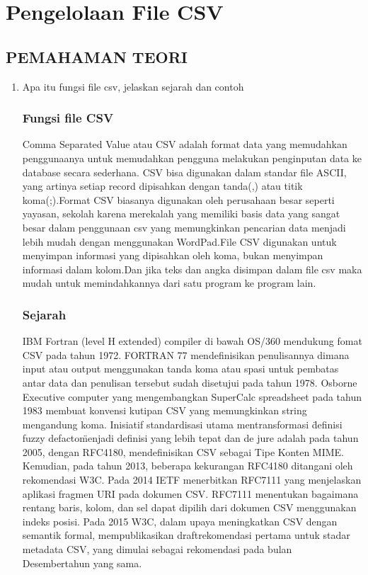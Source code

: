\chapter{Pengelolaan File CSV}
\section{PEMAHAMAN TEORI}
\begin{enumerate}
\item Apa itu fungsi file csv, jelaskan sejarah dan contoh
\subsection{Fungsi file CSV}
Comma Separated Value atau CSV adalah format data yang memudahkan penggunaanya untuk memudahkan pengguna melakukan penginputan data ke database secara sederhana. CSV bisa digunakan dalam standar file ASCII, yang artinya setiap record dipisahkan dengan tanda(,) atau titik koma(;).Format CSV biasanya digunakan oleh perusahaan besar seperti yayasan, sekolah karena merekalah yang memiliki basis data yang sangat besar dalam penggunaan csv yang memungkinkan pencarian data menjadi lebih mudah dengan menggunakan WordPad.File CSV digunakan untuk menyimpan informasi yang dipisahkan oleh koma, bukan menyimpan informasi dalam kolom.Dan jika teks dan angka disimpan dalam file csv maka mudah untuk memindahkannya dari satu program ke program lain.
\subsection{Sejarah}
	IBM Fortran (level H extended) compiler di bawah OS/360 mendukung fomat CSV pada tahun 1972. FORTRAN 77 mendefinisikan penulisannya dimana input atau output menggunakan tanda koma atau spasi untuk pembatas antar data dan penulisan tersebut sudah disetujui pada tahun 1978.
\hfill\break
	Osborne Executive computer yang mengembangkan SuperCalc spreadsheet pada tahun 1983 membuat konvensi kutipan CSV yang memungkinkan string mengandung koma.
\hfill\break
	Inisiatif standardisasi utama \- mentransformasi \"definisi fuzzy defacto\" menjadi definisi yang lebih tepat dan de jure \-adalah pada tahun 2005, dengan RFC4180, mendefinisikan CSV sebagai Tipe Konten MIME. Kemudian, pada tahun 2013, beberapa kekurangan RFC4180 ditangani oleh rekomendasi W3C.
\hfill\break
	Pada 2014 IETF menerbitkan RFC7111 yang menjelaskan aplikasi fragmen URI pada dokumen CSV. RFC7111 menentukan bagaimana rentang baris, kolom, dan sel dapat dipilih dari dokumen CSV menggunakan indeks posisi.
\hfill\break
	Pada 2015 W3C, dalam upaya meningkatkan CSV dengan semantik formal, mempublikasikan draftrekomendasi pertama untuk stadar metadata CSV, yang dimulai sebagai rekomendasi pada bulan Desembertahun yang sama.

\end{enumerate}
